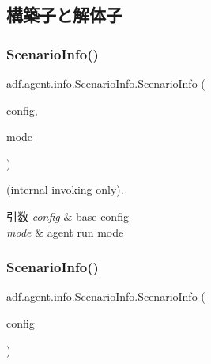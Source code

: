 \subsection{構築子と解体子}
\hypertarget{classadf_1_1agent_1_1info_1_1ScenarioInfo_a3fecc58b0e8396a6935653e872cdb8b6}{}\label{classadf_1_1agent_1_1info_1_1ScenarioInfo_a3fecc58b0e8396a6935653e872cdb8b6} 
\subsubsection{\texorpdfstring{Scenario\+Info()}{ScenarioInfo()}\hspace{0.1cm}{\footnotesize\ttfamily [1/2]}}
{\footnotesize\ttfamily adf.\+agent.\+info.\+Scenario\+Info.\+Scenario\+Info (\begin{DoxyParamCaption}\item[{Config}]{config,  }\item[{\hyperlink{enumadf_1_1agent_1_1info_1_1ScenarioInfo_1_1Mode}{Mode}}]{mode }\end{DoxyParamCaption})}



(internal invoking only). 


\begin{DoxyParams}{引数}
{\em config} & base config \\
\hline
{\em mode} & agent run mode \\
\hline
\end{DoxyParams}
\hypertarget{classadf_1_1agent_1_1info_1_1ScenarioInfo_a6150d210d4172e378c6d427ae48ce6ab}{}\label{classadf_1_1agent_1_1info_1_1ScenarioInfo_a6150d210d4172e378c6d427ae48ce6ab} 
\subsubsection{\texorpdfstring{Scenario\+Info()}{ScenarioInfo()}\hspace{0.1cm}{\footnotesize\ttfamily [2/2]}}
{\footnotesize\ttfamily adf.\+agent.\+info.\+Scenario\+Info.\+Scenario\+Info (\begin{DoxyParamCaption}\item[{Config}]{config }\end{DoxyParamCaption})}



